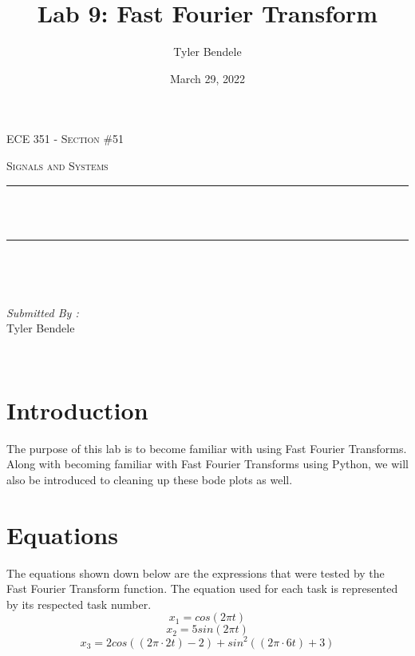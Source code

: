 \documentclass[12pt]{report}
\title{Lab 9: Fast Fourier Transform}
\author{Tyler Bendele}
\date{March 29, 2022}
\makeatletter
\let\thetitle\@title
\makeatother
\begin{document}
\begin{titlepage}
\centering
\vspace*{0.5 cm}

\begin{center}    \textsc{\Large   ECE 351 - Section \#51 }\\[2.0 cm]
\end{center}%
\textsc{\Large Signals and Systems  }\\[0.5 cm] %

\rule{\linewidth}{0.2 mm} \\[0.4 cm]
{ \huge \bfseries \thetitle}\\
\rule{\linewidth}{0.2 mm} \\[1.5 cm]
\begin{minipage}{0.4\textwidth}
\begin{flushleft} \large
\end{flushleft}
\end{minipage}~
\begin{minipage}{0.4\textwidth}
\begin{flushright} \large
\emph{Submitted By :} \\
Tyler Bendele
\end{flushright}
\end{minipage}\\[2 cm]
\end{titlepage}
\tableofcontents
\pagebreak
\renewcommand{\thesection}{\arabic{section}}
\section{Introduction}
The purpose of this lab is to become familiar with using Fast Fourier
Transforms. Along with becoming familiar with Fast Fourier Transforms using
Python, we will also be introduced to cleaning up these bode plots as well.
\section{Equations}
The equations shown down below are the expressions that were tested by the
Fast Fourier Transform function. The equation used for each task is 
represented by its respected task number.
\begin{equation}
    x_{1} = cos(2\pi t)
\end{equation}
\begin{equation}
    x_{2} = 5sin(2\pi t)
\end{equation}
\begin{equation}
    x_{3} = 2cos((2\pi \cdot 2t) - 2) + sin^{2}((2\pi \cdot 6t) + 3)
\end{equation}
\end{document}
